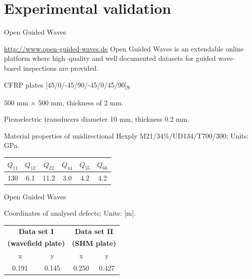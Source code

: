 \documentclass[10pt]{beamer} %
\begin{document}
\section{Experimental validation}
\begin{frame}{Open Guided Waves}
	\begin{block}{\url{http://www.open-guided-waves.de}}
		Open Guided Waves is an extendable online platform where high--quality and well documented datasets for guided wave--based inspections are provided.
	\end{block}

	CFRP plates [45/0/-45/90/-45/0/45/90]\textsubscript{S}
	
	500 mm $\times$ 500 mm, thickness of 2 mm. 
	
	Piezoelectric transducers diameter 10 mm, thickness 0.2 mm.
	
	\begin{table}
		\renewcommand{\arraystretch}{1.3}
		\centering \small
		Material properties of unidirectional Hexply M21/34\%/UD134/T700/300; Units: GPa.
		
		\begin{tabular}{cccccc} 
			\toprule
			$Q_{11}$ & $Q_{12}$  & $Q_{22}$ & $Q_{44}$ & $Q_{55}$ & $Q_{66}$\\
			\midrule
			130& 6.1& 11.2 & 3.0 & 4.2 & 4.2\\
			\bottomrule 
		\end{tabular} 
		\label{tab:mat_prop}
	\end{table}
\end{frame}
\begin{frame}{Open Guided Waves}

	\begin{table}
		\renewcommand{\arraystretch}{1.3}
		\centering \small
		Coordinates of analysed defects; Units: [m].
		
		\begin{tabular}{cccc} 
			\toprule
			\multicolumn{2}{c}{\textbf{Data set I} }	& \multicolumn{2}{c}{\textbf{Data set II} } \\
			\multicolumn{2}{c}{\textbf{(wavefield plate)} }	& \multicolumn{2}{c}{\textbf{(SHM plate)} } \\
			\cmidrule(lr){1-2} \cmidrule(lr){3-4}
			x & y &  x &  y  \\
			0.191 & 0.145 & 0.250  & 0.427 \\ 
			\bottomrule 
		\end{tabular} 
		\label{tab:defect_coordinates}
	\end{table}		
\end{frame}
\end{document}
